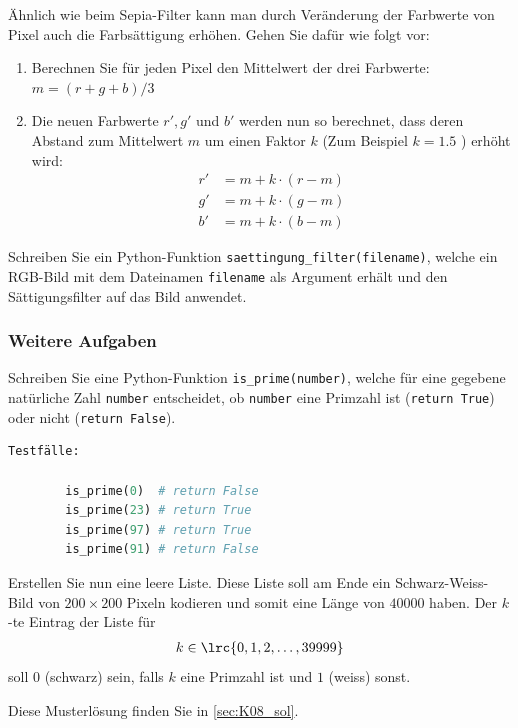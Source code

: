 \begin{myexercise}
	Ähnlich wie beim Sepia-Filter kann man durch Veränderung der Farbwerte von Pixel auch die Farbsättigung erhöhen. Gehen Sie dafür wie folgt vor:
	\begin{enumerate}
		\item Berechnen Sie für jeden Pixel den Mittelwert der drei Farbwerte: \( m = (r+g+b) / 3 \)
		\item Die neuen Farbwerte \(r', g'\) und \( b' \) werden nun so berechnet, dass deren Abstand zum Mittelwert \( m \) um einen Faktor \(k \) (Zum Beispiel \( k = 1.5 \) ) erhöht wird:
		      \begin{align*}
			      r' & = m + k\cdot (r-m) \\
			      g' & = m + k\cdot (g-m) \\
			      b' & = m + k\cdot (b-m)
		      \end{align*}


	\end{enumerate}

	Schreiben Sie ein Python-Funktion \lstinline|saettingung_filter(filename)|, welche ein RGB-Bild mit dem Dateinamen \lstinline|filename| als Argument erhält und den Sättigungsfilter auf das Bild anwendet.
\end{myexercise}

\subsubsection{Weitere Aufgaben}
\begin{myexercise}
	Schreiben Sie eine Python-Funktion \lstinline|is_prime(number)|, welche für eine gegebene natürliche Zahl \lstinline|number| entscheidet, ob \lstinline|number| eine Primzahl ist (\lstinline|return True|) oder nicht (\lstinline|return False|).

	\begin{lstlisting}[language=Python,numbers=none]
        Testfälle:

        is_prime(0)  # return False
        is_prime(23) # return True
        is_prime(97) # return True
        is_prime(91) # return False
	\end{lstlisting}

	Erstellen Sie nun eine leere Liste. Diese Liste soll am Ende ein Schwarz-Weiss-Bild von \(200\times 200\) Pixeln kodieren und somit eine Länge von \(40000\) haben. Der \(k\)-te Eintrag der Liste für
	\begin{align*}
		k \in\lrc{0, 1, 2, \ldots, 39999}
	\end{align*}
	soll \(0\) (schwarz) sein, falls \(k\) eine Primzahl ist und \(1\) (weiss) sonst.

	\begin{myanswer}
		Diese Musterlösung finden Sie in \cref{sec:K08_sol}.
	\end{myanswer}
\end{myexercise}

